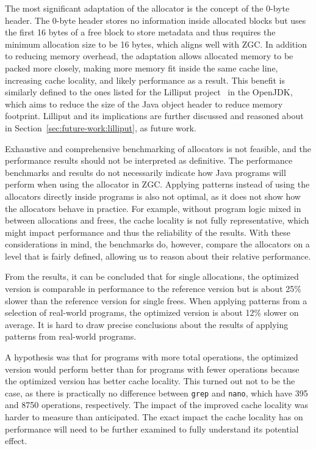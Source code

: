 
The most significant adaptation of the allocator is the concept of the 0-byte header. The 0-byte header stores no information inside allocated blocks but uses the first 16 bytes of a free block to store metadata and thus requires the minimum allocation size to be 16 bytes, which aligns well with ZGC. In addition to reducing memory overhead, the adaptation allows allocated memory to be packed more closely, making more memory fit inside the same cache line, increasing cache locality, and likely performance as a result. This benefit is similarly defined to the ones listed for the Lilliput project~\cite{lilliput} in the OpenJDK, which aims to reduce the size of the Java object header to reduce memory footprint. Lilliput and its implications are further discussed and reasoned about in Section~\ref{sec:future-work:lilliput}, as future work.

Exhaustive and comprehensive benchmarking of allocators is not feasible, and the performance results should not be interpreted as definitive. The performance benchmarks and results do not necessarily indicate how Java programs will perform when using the allocator in ZGC. Applying patterns instead of using the allocators directly inside programs is also not optimal, as it does not show how the allocators behave in practice. For example, without program logic mixed in between allocations and frees, the cache locality is not fully representative, which might impact performance and thus the reliability of the results. With these considerations in mind, the benchmarks do, however, compare the allocators on a level that is fairly defined, allowing us to reason about their relative performance. 

From the results, it can be concluded that for single allocations, the optimized version is comparable in performance to the reference version but is about 25\% slower than the reference version for single frees. When applying patterns from a selection of real-world programs, the optimized version is about 12\% slower on average. It is hard to draw precise conclusions about the results of applying patterns from real-world programs. 

A hypothesis was that for programs with more total operations, the optimized version would perform better than for programs with fewer operations because the optimized version has better cache locality. This turned out not to be the case, as there is practically no difference between \texttt{grep} and \texttt{nano}, which have 395 and 8750 operations, respectively. The impact of the improved cache locality was harder to measure than anticipated. The exact impact the cache locality has on performance will need to be further examined to fully understand its potential effect.

